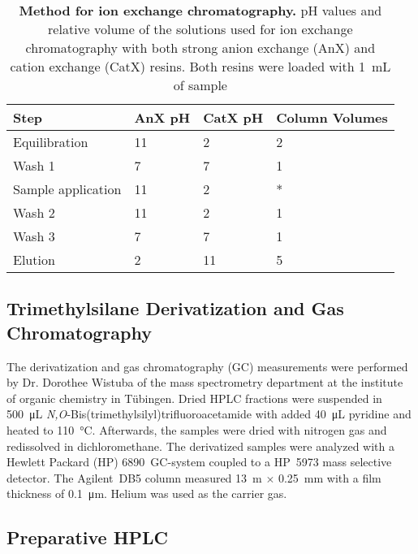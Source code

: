 	\begin{table}[htbp]
		\caption[Method for ion exchange chromatography]{\textbf{Method for ion exchange chromatography.} pH values and relative volume of the solutions used for ion exchange chromatography with both strong anion exchange (AnX) and cation exchange (CatX) resins. Both resins were loaded with \SI{1}{\milli\liter} of sample}
		\label{tab:ion_exchange_tab}
		\centering
		\begin{tabularx}{\textwidth}{XXXX}
			\toprule
			\textbf{Step} 			& \textbf{AnX pH}	& \textbf{CatX pH} 	& \textbf{Column Volumes} 	\\
			\midrule
			Equilibration 	 		& 11 				& 2 				& 2		\\
			Wash 1 					& 7 				& 7 				& 1 	\\
			Sample application 		& 11 				& 2 				& *		\\
			Wash 2  				& 11 				& 2 				& 1 	\\
			Wash 3 					& 7					& 7 				& 1 	\\
			Elution 				& 2 				& 11 				& 5 	\\
			\bottomrule
		\end{tabularx}
	\end{table}

	\subsection{Trimethylsilane Derivatization and Gas Chromatography} %
	\label{sub:trimethylsilane_derivatization_and_gas_chromatography}

	The derivatization and gas chromatography (GC) measurements were performed by Dr. Dorothee Wistuba of the mass spectrometry department at the institute of organic chemistry in Tübingen.
	Dried HPLC fractions were suspended in \SI{500}{\micro\liter} \emph{N,O}-Bis(trimethylsilyl)\-trifluoro\-acetamide with added \SI{40}{\micro\liter} pyridine and heated to \SI{110}{\celsius}. Afterwards, the samples were dried with nitrogen gas and redissolved in dichloromethane.
	The derivatized samples were analyzed with a Hewlett Packard (HP) 6890~GC-system coupled to a HP~5973 mass selective detector. The Agilent~DB5 column measured 13~m $\times$ 0.25~mm with a film thickness of \SI{0.1}{\micro\meter}. Helium was used as the carrier gas.

	\subsection{Preparative HPLC} %
	\label{sub:preparative_hplc}

